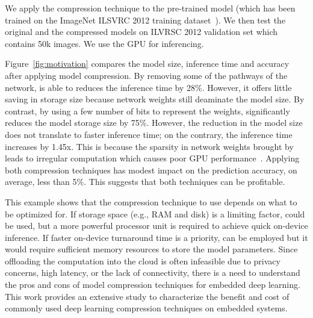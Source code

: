  We apply the compression technique to the pre-trained model (which has been trained on the ImageNet ILSVRC 2012
training dataset~\cite{}). We then test the original and the compressed models on ILVRSC 2012 validation set which contains 50k images.
 We use the GPU for
inferencing.

 Figure~\ref{fig:motivation} compares the model size, inference time and accuracy after applying model
compression. By removing some of the pathways of the network, \pruning is able to reduces the inference time by 28\%. However, it offers
little saving in storage size because network weights still deaminate the model size. By contrast, by using a few number of bits to
represent the weights, \quantization significantly reduces the model storage size by 75\%. However, the reduction in the model size does
not translate to faster inference time; on the contrary, the inference time increases by 1.45x. This is because the sparsity in network
weights brought by \quantization leads to irregular computation which causes poor GPU performance~\cite{}. Applying both compression
techniques has modest impact on the prediction accuracy, on average, less than 5\%. This suggests that both techniques can be profitable.

 This example shows that the compression technique to use depends on what to be optimized for. If storage
space (e.g., RAM and disk) is a limiting factor, \quantization could be used, but a more powerful processor unit is required to achieve
quick on-device inference. If faster on-device turnaround time is a priority, \pruning can be employed but it would require sufficient
memory resources to store the model parameters.  Since offloading the computation into the cloud is often infeasible due to privacy
concerns, high latency, or the lack of connectivity, there is a need to understand the pros and cons of model compression techniques for
embedded deep learning. This work provides an extensive study to characterize the benefit and cost of commonly used deep learning
compression techniques on embedded systems.
